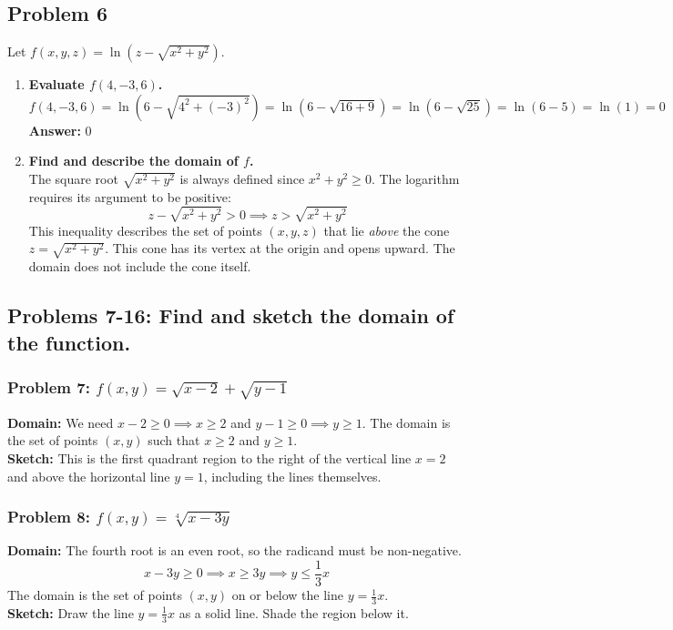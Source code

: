 \documentclass{article}
\begin{document}
\subsection{Problem 6}
Let $f(x, y, z) = \ln(z - \sqrt{x^2 + y^2})$.
\begin{enumerate}[label=\alph*.]
    \item \textbf{Evaluate $f(4, -3, 6)$.} \\
    \[ f(4, -3, 6) = \ln(6 - \sqrt{4^2 + (-3)^2}) = \ln(6 - \sqrt{16 + 9}) = \ln(6 - \sqrt{25}) = \ln(6 - 5) = \ln(1) = 0 \]
    \textbf{Answer:} $0$
    
    \item \textbf{Find and describe the domain of $f$.} \\
    The square root $\sqrt{x^2+y^2}$ is always defined since $x^2+y^2 \ge 0$. The logarithm requires its argument to be positive:
    \[ z - \sqrt{x^2 + y^2} > 0 \implies z > \sqrt{x^2 + y^2} \]
    This inequality describes the set of points $(x, y, z)$ that lie \textit{above} the cone $z = \sqrt{x^2 + y^2}$. This cone has its vertex at the origin and opens upward. The domain does not include the cone itself.
\end{enumerate}

\subsection{Problems 7-16: Find and sketch the domain of the function.}

\subsubsection{Problem 7: $f(x, y) = \sqrt{x-2} + \sqrt{y-1}$}
\textbf{Domain:} We need $x-2 \ge 0 \implies x \ge 2$ and $y-1 \ge 0 \implies y \ge 1$. The domain is the set of points $(x, y)$ such that $x \ge 2$ and $y \ge 1$. \\
\textbf{Sketch:} This is the first quadrant region to the right of the vertical line $x=2$ and above the horizontal line $y=1$, including the lines themselves.

\subsubsection{Problem 8: $f(x, y) = \sqrt[4]{x-3y}$}
\textbf{Domain:} The fourth root is an even root, so the radicand must be non-negative.
\[ x - 3y \ge 0 \implies x \ge 3y \implies y \le \frac{1}{3}x \]
The domain is the set of points $(x, y)$ on or below the line $y = \frac{1}{3}x$. \\
\textbf{Sketch:} Draw the line $y=\frac{1}{3}x$ as a solid line. Shade the region below it.
\end{document}
